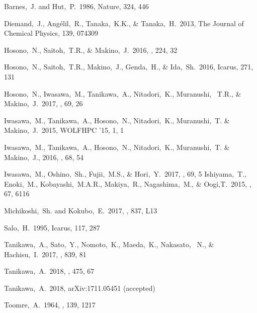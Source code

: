 \documentclass[twocolumn,useamsfonts]{pasj01}
\begin{document}
\begin{thebibliography}{}

{Barnes},~J. and {Hut},~P.\ 1986, Nature, 324, 446

Diemand,~J., Ang{\' e}lil,~R., Tanaka,~K.K., \& Tanaka,~H.\ 2013, The Journal of Chemical Physics, 139, 074309

Hosono,~N., Saitoh,~T.R., \& Makino,~J.\ 2016, \apjsupp, 224, 32

Hosono,~N., Saitoh,~T.R., Makino,~J., Genda,~H., \& Ida,~Sh.\ 2016, Icarus, 271, 131

Hosono,~N., Iwasawa,~M., Tanikawa,~A., Nitadori,~K., Muranushi, ~T.R., \& Makino,~J.\ 2017, \pasj, 69, 26

Iwasawa,~M., Tanikawa,~A., Hosono,~N., Nitadori,~K., Muranushi,~T. \& Makino,~J.\ 2015, WOLFHPC '15, 1, 1

Iwasawa,~M.,  Tanikawa,~A., Hosono,~N., Nitadori,~K., Muranushi,~T. \& Makino,~J., 2016, \pasj, 68, 54

Iwasawa,~M., Oshino,~Sh., Fujii,~M.S., \& Hori,~Y.\ 2017, \pasj, 69, 5
Ishiyama,~T., Enoki,~M., Kobayashi,~M.A.R., Makiya,~R., Nagashima,~M., \& Oogi,T.\ 2015, \pasj, 67, 6116

{Michikoshi},~Sh. and {Kokubo},~E.\ 2017, \apjlett, 837, L13 

Salo,~H.\ 1995, {Icarus}, 117, 287

Tanikawa,~A., Sato,~Y., Nomoto,~K., Maeda,~K., Nakasato,~ N., \&  Hachisu,~I.\ 2017, \apj, 839, 81

Tanikawa,~A.\ 2018, \mnras, 475, 67

Tanikawa,~A.\ 2018, arXiv:1711.05451 (accepted)

Toomre,~A.\ 1964, \apj, 139, 1217

\end{thebibliography}


\end{document}
